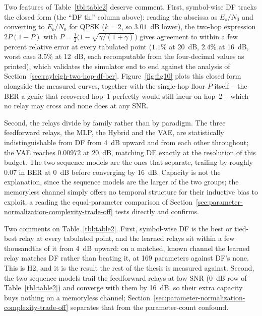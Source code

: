 Two features of Table~\ref{tbl:table2} deserve comment. First, symbol-wise DF tracks the closed form (the ``DF th.'' column above): reading the abscissa as $E_s/N_0$ and converting to $E_b/N_0$ for QPSK ($k=2$, so $3.01$~dB lower), the two-hop expression $2P(1-P)$ with $P=\tfrac12\bigl(1-\sqrt{\bar\gamma/(1+\bar\gamma)}\bigr)$ gives agreement to within a few percent relative error at every tabulated point ($1.1\%$ at 20~dB, $2.4\%$ at 16~dB, worst case $3.5\%$ at 12~dB, each recomputable from the four-decimal values as printed), which validates the simulator end to end against the analysis of Section~\ref{sec:rayleigh-two-hop-df-ber}. Figure~\ref{fig:fig10} plots this closed form alongside the measured curves, together with the single-hop floor $P$ itself -- the BER a genie that recovered hop~1 perfectly would still incur on hop~2 -- which no relay may cross and none does at any SNR.

Second, the relays divide by family rather than by paradigm. The three feedforward relays, the MLP, the Hybrid and the VAE, are statistically indistinguishable from DF from 4~dB upward and from each other throughout; the VAE reaches $0.00972$ at 20~dB, matching DF exactly at the resolution of this budget. The two sequence models are the ones that separate, trailing by roughly $0.07$ in BER at 0~dB before converging by 16~dB. Capacity is not the explanation, since the sequence models are the larger of the two groups; the memoryless channel simply offers no temporal structure for their inductive bias to exploit, a reading the equal-parameter comparison of Section~\ref{sec:parameter-normalization-complexity-trade-off} tests directly and confirms.

Two comments on Table~\ref{tbl:table2}. First, symbol-wise DF is the best or tied-best relay at every tabulated point, and the learned relays sit within a few thousandths of it from 4~dB upward: on a matched, known channel the learned relay matches DF rather than beating it, at 169 parameters against DF's none. This is H2, and it is the result the rest of the thesis is measured against. Second, the two sequence models trail the feedforward relays at low SNR (0~dB row of Table~\ref{tbl:table2}) and converge with them by 16~dB, so their extra capacity buys nothing on a memoryless channel; Section~\ref{sec:parameter-normalization-complexity-trade-off} separates that from the parameter-count confound.

